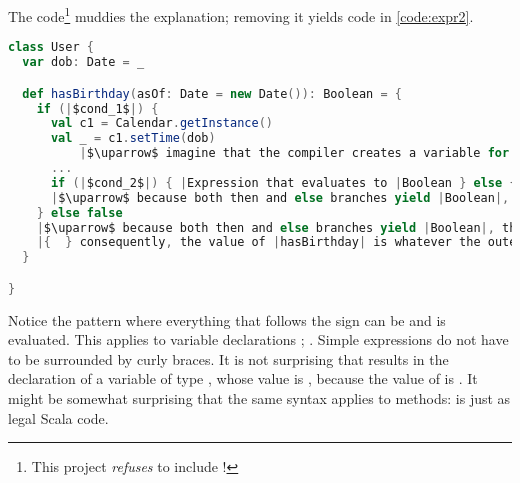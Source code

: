 \documentclass[10 pt]{article}
\begin{document}
The  code\footnote{This project \emph{refuses} to include !} muddies the explanation; removing it yields code in \autoref{code:expr2}.

\begin{lstlisting}[caption={Expressions}, label={code:expr2}, language=Scala, escapechar=|]
class User {
  var dob: Date = _

  def hasBirthday(asOf: Date = new Date()): Boolean = {
    if (|$cond_1$|) {
      val c1 = Calendar.getInstance()
      val _ = c1.setTime(dob)
          |$\uparrow$ imagine that the compiler creates a variable for every expression that isn't the last one in a block.|
      ...
      if (|$cond_2$|) { |Expression that evaluates to |Boolean } else { |Expression that evaluates to |Boolean }
      |$\uparrow$ because both then and else branches yield |Boolean|, the value of the entire |if| expression is |Boolean|.|
    } else false
    |$\uparrow$ because both then and else branches yield |Boolean|, the value of the entire |if| expression is |Boolean|.|
    |{  } consequently, the value of |hasBirthday| is whatever the outer |if| expression evaluates to.|
  }

}
\end{lstlisting}

Notice the pattern where everything that follows the \pcode{=} sign can be and is evaluated. This applies to variable declarations ; . Simple expressions do not have to be surrounded by curly braces. It is not surprising that  results in the declaration of a variable  of type , whose value is , because the value of  is . It might be somewhat surprising that the same syntax applies to methods:  is just as legal Scala code.
\end{document}
